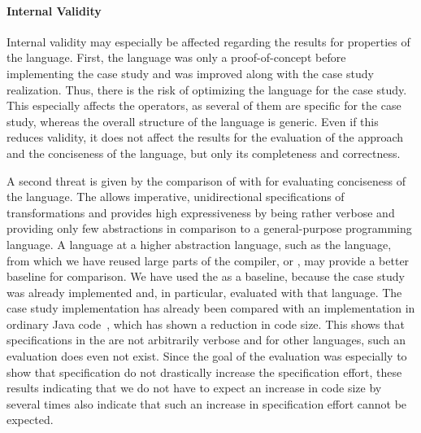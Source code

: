 

\paragraph{Internal Validity}
Internal validity may especially be affected regarding the results for properties of the \commonalities language.
First, the language was only a proof-of-concept before implementing the case study and was improved along with the case study realization.
Thus, there is the risk of optimizing the language for the case study.
This especially affects the operators, as several of them are specific for the case study, whereas the overall structure of the language is generic.
Even if this reduces validity, it does not affect the results for the evaluation of the \commonalities approach and the conciseness of the language, but only its completeness and correctness.

A second threat is given by the comparison of \commonalities with \reactions for evaluating conciseness of the language.
The \reactionslanguage allows imperative, unidirectional specifications of transformations and provides high expressiveness by being rather verbose and providing only few abstractions in comparison to a general-purpose programming language.
A language at a higher abstraction language, such as the \mappings language, from which we have reused large parts of the compiler, or \qvtr, may provide a better baseline for comparison.
We have used the \reactionslanguage as a baseline, because the case study was already implemented and, in particular, evaluated with that language.
The case study implementation has already been compared with an implementation in ordinary Java code~, which has shown a reduction in code size.
This shows that specifications in the \reactionslanguage are not arbitrarily verbose and for other languages, such an evaluation does even not exist.
Since the goal of the evaluation was especially to show that \commonalities specification do not drastically increase the specification effort, these results indicating that we do not have to expect an increase in code size by several times also indicate that such an increase in specification effort cannot be expected.

